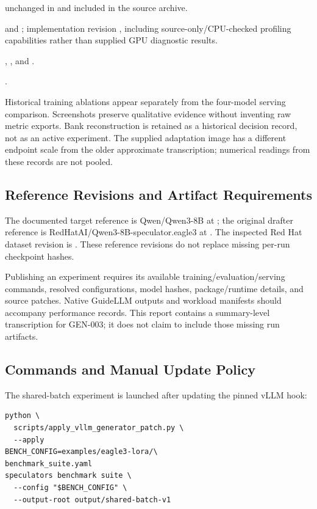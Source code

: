 \begin{description}[leftmargin=0pt]
  unchanged in  and included in the source archive.
  \item[Serving/profiling]  and
  ; implementation revision
  , including source-only/CPU-checked
  profiling capabilities rather than supplied GPU diagnostic results.
  \item[Training] ,
  , and
  .
  \item[Datasets] .
\end{description}

Historical training ablations appear separately from the four-model serving
comparison. Screenshots preserve qualitative evidence without inventing raw
metric exports. Bank reconstruction is retained as a historical decision record,
not as an active experiment. The supplied adaptation image has a different
endpoint scale from the older approximate transcription; numerical readings
from these records are not pooled.

\subsection{Reference Revisions and Artifact Requirements}
The documented target reference is Qwen/Qwen3-8B at
; the original drafter reference
is RedHatAI/Qwen3-8B-speculator.eagle3 at
. The inspected Red Hat dataset
revision is .
These reference revisions do not replace missing per-run checkpoint hashes.

Publishing an experiment requires its available training/evaluation/serving
commands, resolved configurations, model hashes, package/runtime details, and
source patches. Native GuideLLM outputs and workload manifests should accompany
performance records. This report contains a summary-level transcription for
GEN-003; it does not claim to include those missing run artifacts.

\noindent\begin{minipage}{\columnwidth}
\subsection{Commands and Manual Update Policy}
The shared-batch experiment is launched after updating the pinned vLLM hook:
\begingroup\footnotesize
\begin{verbatim}
python \
  scripts/apply_vllm_generator_patch.py \
  --apply
BENCH_CONFIG=examples/eagle3-lora/\
benchmark_suite.yaml
speculators benchmark suite \
  --config "$BENCH_CONFIG" \
  --output-root output/shared-batch-v1
\end{verbatim}
\endgroup
\end{minipage}

